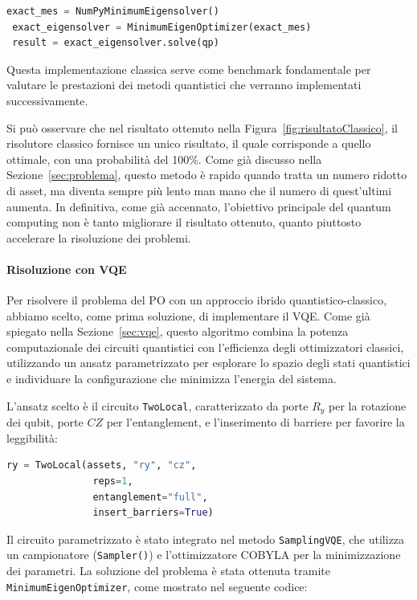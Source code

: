 \begin{lstlisting}[language=python, caption={Risoluzione classica del problema utilizzando \texttt{NumPyMinimumEigensolver.}}]
 exact_mes = NumPyMinimumEigensolver()
 exact_eigensolver = MinimumEigenOptimizer(exact_mes)
 result = exact_eigensolver.solve(qp)
\end{lstlisting}

Questa implementazione classica serve come benchmark fondamentale per 
valutare le prestazioni dei metodi quantistici che verranno 
implementati successivamente.

Si può osservare che nel risultato ottenuto nella Figura~\ref{fig:risultatoClassico}, il risolutore 
classico fornisce un unico risultato, il quale corrisponde a quello ottimale, con una probabilità 
del 100\%. Come già discusso nella Sezione~\ref{sec:problema}, questo metodo 
è rapido quando tratta un numero ridotto di asset, ma diventa sempre più lento 
man mano che il numero di quest'ultimi aumenta. In definitiva, come già accennato, 
l'obiettivo principale del quantum computing non è tanto migliorare il 
risultato ottenuto, quanto piuttosto accelerare la risoluzione dei problemi.

\paragraph{Risoluzione con VQE}
Per risolvere il problema del PO con un approccio ibrido quantistico-classico, 
abbiamo scelto, come prima soluzione, di implementare il VQE. Come già spiegato 
nella Sezione~\ref{sec:vqe}, questo algoritmo combina la potenza computazionale 
dei circuiti quantistici con l'efficienza degli ottimizzatori classici, utilizzando 
un ansatz parametrizzato per esplorare lo spazio degli stati quantistici e 
individuare la configurazione che minimizza l'energia del sistema.

L'ansatz scelto è il circuito \texttt{TwoLocal}, caratterizzato da porte $R_y$ per 
la rotazione dei qubit, porte $CZ$ per l'entanglement, e l'inserimento di barriere 
per favorire la leggibilità:

\begin{lstlisting}[language=python, caption={\mmerenda{todo}}]
 ry = TwoLocal(assets, "ry", "cz", 
               reps=1, 
               entanglement="full", 
               insert_barriers=True)
\end{lstlisting}

Il circuito parametrizzato è stato integrato nel metodo \texttt{SamplingVQE}, che 
utilizza un campionatore (\texttt{Sampler()}) e l'ottimizzatore COBYLA per la 
minimizzazione dei parametri. La soluzione del problema è stata ottenuta tramite 
\texttt{MinimumEigenOptimizer}, come mostrato nel seguente codice:

